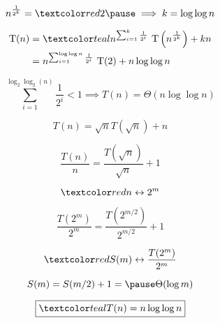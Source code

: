\begin{frame}{}
  \[
    n^{\frac{1}{2^k}} = \red{2} \pause \implies k = \log\log n
  \]

  \pause
  \vspace{-0.30cm}
  \begin{align*} 
    \text{T}(n) &= \teal{n^{\sum_{i=1}^{k}\frac{1}{2^i}}\ \text{T}\left(n^{\frac{1}{2^k}}\right) + kn}\\ 
	    &=n^{\sum_{i=1}^{\log\log n}\frac{1}{2^i}}\ \text{T}(2) + n \log\log n\\ 
  \end{align*}

  \pause
  \vspace{-0.30cm}
  \[
    \sum_{i=1}^{\log_2\log_2(n)}\frac{1}{2^i} < 1 \implies T(n) = \Theta(n \log \log n)
  \]

  \pause
  \vspace{0.40cm}
  \centerline{}
\end{frame}

\begin{frame}{}
  \[
    \boxed{T(n) = \sqrt{n} T(\sqrt{n}) + n}
  \]

  \pause
  \[
    \frac{T(n)}{n} = \frac{T(\sqrt{n})}{\sqrt{n}} + 1
  \]

  \pause
  \[
    \red{n \leftrightarrow 2^m}
  \]

  \pause
  \[
    \frac{T(2^m)}{2^m} = \frac{T(2^{m/2})}{2^{m/2}} + 1
  \]

  \pause
  \[
    \red{S(m) \leftrightarrow \frac{T(2^m)}{2^m}}
  \]

  \pause
  \[
    S(m) = S(m/2) + 1 = \pause \Theta(\log m)
  \]

  \pause
  \vspace{-0.60cm}
  \[
    \boxed{\teal{T(n) = n \log \log n}}
  \]
\end{frame}

\begin{frame}{}
  \begin{columns}
  \end{columns}
\end{frame}
